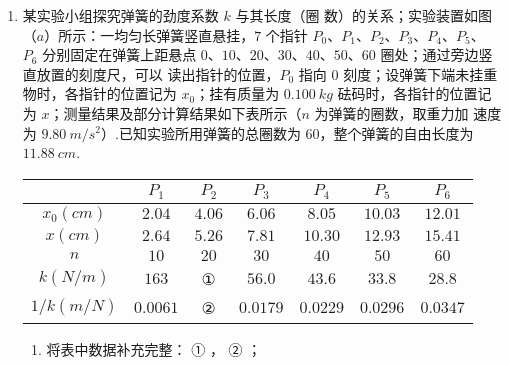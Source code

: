 \begin{enumerate}
\newpage
\item 
{}
某实验小组探究弹簧的劲度系数 $ k $ 与其长度（圈
数）的关系；实验装置如图（$ a $）所示：一均匀长弹簧竖直悬挂，$ 7 $ 个指针 $ P_{0} $、$ P_{1} $、$ P_{2} $、$ P_{3} $、$ P_{4} $、$ P_{5} $、
$ P_{6} $ 分别固定在弹簧上距悬点 $ 0 $、$ 10 $、$ 20 $、$ 30 $、$ 40 $、$ 50 $、$ 60 $ 圈处；通过旁边竖直放置的刻度尺，可以
读出指针的位置，$ P_{0} $ 指向 $ 0 $ 刻度；设弹簧下端未挂重物时，各指针的位置记为 $ x_{0} $；挂有质量为 $ 0.100 \ kg $
砝码时，各指针的位置记为 $ x $；测量结果及部分计算结果如下表所示（$ n $ 为弹簧的圈数，取重力加
速度为 $ 9.80 \ m/s^{2} $）.已知实验所用弹簧的总圈数为 $ 60 $，整个弹簧的自由长度为 $ 11.88 \ cm $.
\begin{minipage}[h!]{0.6\linewidth}
\vspace{0.5em}
\begin{tabular}{|c|c|c|c|c|c|c|}
\hline 
& $ P_{1} $ & $ P_{2} $ & $ P_{3} $ & $ P_{4} $ & $ P_{5} $ & $ P_{6} $
 \\
\hline
$ x_0(cm) $ & $ 2.04 $ & $ 4.06 $ & $ 6.06 $ & $ 8.05 $ & $ 10.03 $ & $ 12.01 $
 \\
\hline
$ x(cm) $ & $ 2.64 $ & $ 5.26 $ & $ 7.81 $ & $ 10.30 $ & $ 12.93 $ & $ 15.41 $
 \\
\hline
$ n $ & $ 10 $ & $ 20 $ & $ 30 $ & $ 40 $ & $ 50 $ & $ 60 $
 \\
\hline
$ k(N/m) $ & $ 163 $ & ① & $ 56.0 $ & $ 43.6 $ & $ 33.8 $ & $ 28.8 $
 \\
\hline
$ 1/k(m/N) $ & $ 0.0061 $ & ② & $ 0.0179 $ & $ 0.0229 $ & $ 0.0296 $ & $ 0.0347 $\\ 
\hline 
\end{tabular}
\vspace{0.5em}
\end{minipage}
\hfill
\begin{minipage}[h!]{0.3\linewidth}
\flushright
\vspace{0.5em}

\vspace{0.5em}
\end{minipage}




\begin{enumerate}
\renewcommand{\labelenumi}{\arabic{enumi}.}
\item
将表中数据补充完整： ①  ， ②  ；



\end{enumerate}
\end{enumerate}
